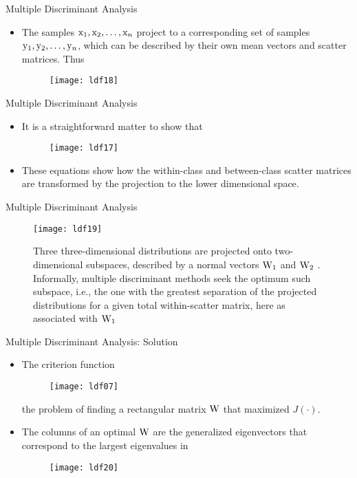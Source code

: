 \begin{frame}{Multiple Discriminant Analysis}
\begin{itemize}
\item The samples ${\rm x}_1,{\rm x}_2,\ldots,{\rm x}_n$ project to a corresponding set of samples ${\rm y}_1,{\rm y}_2,\ldots,{\rm y}_n$, which can be described by their own mean vectors and scatter matrices. Thus
\begin{figure}
\texttt{[image: ldf18]}
\end{figure}
\end{itemize}
\end{frame}

\begin{frame}{Multiple Discriminant Analysis}
\begin{itemize}
\item It is a straightforward matter to show that
\begin{figure}
\texttt{[image: ldf17]}
\end{figure}
\item These equations show how the within-class and between-class scatter matrices are transformed by the projection to the lower dimensional space.
\end{itemize}
\end{frame}

\begin{frame}{Multiple Discriminant Analysis}
\begin{figure}
\texttt{[image: ldf19]}
\caption{Three three-dimensional distributions are projected onto two-dimensional
subspaces, described by a normal vectors ${\rm W}_1$ and ${\rm W}_2$ . Informally, multiple discriminant methods seek the optimum such subspace, i.e., the one with the greatest separation of the projected distributions for a given total within-scatter matrix, here as
associated with ${\rm W}_1$}
\end{figure}
\end{frame}

\begin{frame}{Multiple Discriminant Analysis: Solution}
\begin{itemize}
\item The criterion function
\begin{figure}
\texttt{[image: ldf07]}
\end{figure}
the problem of finding a rectangular matrix ${\rm W}$ that maximized $J(\cdot)$. 
\item The columns of an optimal ${\rm W}$ are the generalized eigenvectors that correspond to the largest eigenvalues in
\begin{figure}
\texttt{[image: ldf20]}
\end{figure}
\end{itemize}
\end{frame}

